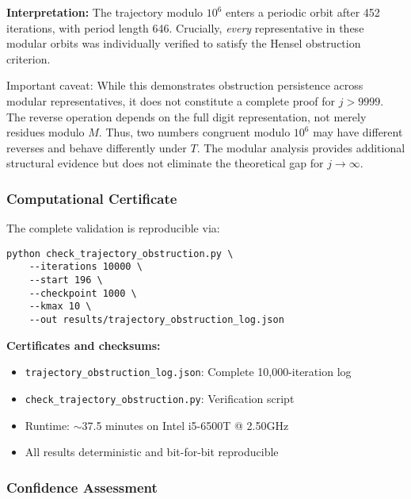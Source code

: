 \documentclass[12pt,a4paper]{article}
\begin{document}
	\textbf{Interpretation:} The trajectory modulo $10^6$ enters a periodic 
orbit after 452 iterations, with period length 646. Crucially, \textit{every} 
representative in these modular orbits was individually verified to satisfy 
the Hensel obstruction criterion. 

	{Important caveat:} While this demonstrates obstruction persistence 
across modular representatives, it does not constitute a complete proof for 
$j > 9999$. The reverse operation depends on the full digit representation, 
not merely residues modulo $M$. Thus, two numbers congruent modulo $10^6$ 
may have different reverses and behave differently under $T$. The modular 
analysis provides additional structural evidence but does not eliminate 
the theoretical gap for $j \to \infty$.

\subsubsection{Computational Certificate}

The complete validation is reproducible via:

\begin{verbatim}
python check_trajectory_obstruction.py \
	--iterations 10000 \
	--start 196 \
	--checkpoint 1000 \
	--kmax 10 \
	--out results/trajectory_obstruction_log.json
\end{verbatim}

	\textbf{Certificates and checksums:}
\begin{itemize}
\item \texttt{trajectory\_obstruction\_log.json}: Complete 10,000-iteration log
\item \texttt{check\_trajectory\_obstruction.py}: Verification script
\item Runtime: $\sim$37.5 minutes on Intel i5-6500T @ 2.50GHz
\item All results deterministic and bit-for-bit reproducible
\end{itemize}

\subsubsection{Confidence Assessment}
\end{document}
